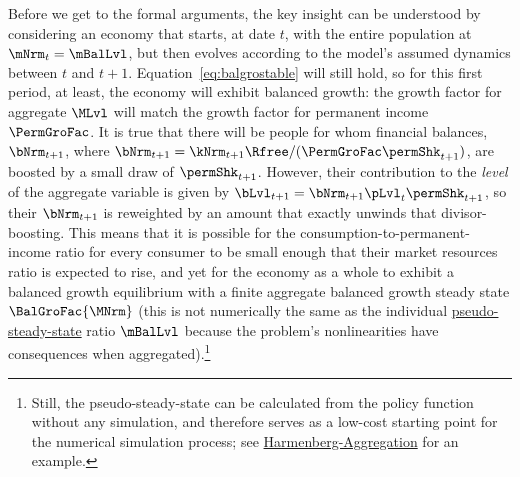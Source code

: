\documentclass[BufferStockTheory]{subfiles}
\begin{document}
Before we get to the formal arguments, the key insight can be understood by considering an economy that starts, at date $t$, with the entire population at $\mNrm_{t}=\mBalLvl$, but then evolves according to the model's assumed dynamics between $t$ and $t+1$.
Equation~\eqref{eq:balgrostable} will still hold, so for this first period, at least, the economy will exhibit balanced growth: the growth factor for aggregate $\MLvl$ will match the growth factor for permanent income $\PermGroFac$.
It is true that there will be people for whom financial balances, $\bNrm_{t+1}$, where $\bNrm_{t+1} = \kNrm_{t+1}\Rfree/(\PermGroFac\permShk_{t+1})$, are boosted by a small draw of $\permShk_{t+1}$.
However, their contribution to the \textit{level} of the aggregate variable is given by $\bLvl_{t+1}=\bNrm_{t+1}\pLvl_{t}\permShk_{t+1}$, so their $\bNrm_{t+1}$ is reweighted by an amount that exactly unwinds that divisor-boosting.
This means that it is possible for the consumption-to-permanent-income ratio for every consumer to be small enough that their market resources ratio is expected to rise, and yet for the economy as a whole to exhibit a balanced growth equilibrium with a finite aggregate balanced growth steady state $\BalGroFac{\MNrm}$ (this is not numerically the same as the individual \hyperlink{pseudo-steady-state}{pseudo-steady-state} ratio $\mBalLvl$ because the problem's nonlinearities have consequences when aggregated).\footnote{Still, the pseudo-steady-state can be calculated from the policy function without any simulation, and therefore serves as a low-cost starting point for the numerical simulation process; see \href{https://econ-ark.org/materials/harmenberg-aggregation?launch}{Harmenberg-Aggregation} for an example.}
\end{document}
